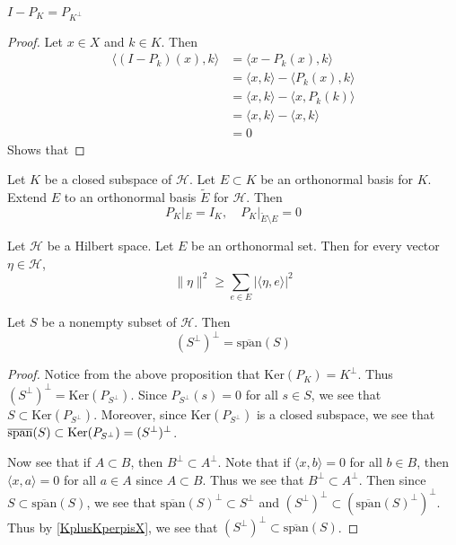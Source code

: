 
\begin{proposition}
  $I-P_K = P_{K^\perp}$
\end{proposition}
\begin{proof}
  Let $x \in X$ and $k \in K$. Then
  \begin{align*}
    \langle (I - P_k)(x), k \rangle &= \langle  x - P_k(x) , k \rangle \\
    &= \langle  x , k \rangle - \langle P_k(x) ,  k \rangle  \\
    &= \langle x , k \rangle  - \langle x , P_k(k) \rangle \\
    &= \langle x , k \rangle  - \langle  x , k \rangle  \\
    &= 0
  \end{align*}
  Shows that
\end{proof}

\begin{proposition}
  Let $K$ be a closed subspace of $\mathcal{H}$. Let $E \subset K$ be
  an orthonormal basis
  for $K$. Extend $E$ to an orthonormal basis $\tilde{E}$ for
  $\mathcal{H}$. Then \[
    P_K|_E = I_K, \quad P_K|_{\tilde{E} \setminus E} = 0
  \]
\end{proposition}

\begin{remark}
  Let $\mathcal{H}$ be a Hilbert space. Let $E$ be an orthonormal set. Then for
  every vector $\eta \in \mathcal{H}$, \[
    \|\eta\|^2 \ge \sum_{e \in E} |\langle \eta ,  e \rangle |^2
  \]
\end{remark}

\begin{lemma}
  Let $S$ be a nonempty subset of $\mathcal{H}$. Then \[
    (S^\perp)^\perp  = \overline{\textrm{span}}(S)
  \]
\end{lemma}
\begin{proof}
  \label{PerpPerpisSpan}
  Notice from the above proposition that $\textrm{Ker}(P_K) =
  K^\perp$. Thus $(S^\perp)^\perp = \textrm{Ker}(P_{S^\perp})$. Since
  $P_{S^\perp}(s) = 0$ for all $s \in S$, we see that $S \subset
  \textrm{Ker}(P_{S^\perp})$. Moreover, since
  $\textrm{Ker}(P_{S^\perp})$ is a closed subspace, we see that
  $\overline{ \textrm{\textrm{span}}}(S) \subset
  \textrm{Ker}(P_{S^\perp}) = ( S^\perp)^\perp$.

  Now see that if $A \subset B$, then $B^\perp \subset A^\perp$. Note
  that if $\langle  x , b \rangle  = 0$ for all $b \in B$, then
  $\langle  x , a \rangle =0$ for all $a \in A$ since $A \subset B$.
  Thus we see that $B^\perp \subset A^\perp$. Then since $S \subset
  \overline{\textrm{span}}(S)$, we see that
  $\overline{\textrm{span}}(S)^\perp \subset S^\perp$ and
  $(S^\perp)^\perp \subset
  (\overline{\textrm{span}}(S)^\perp)^\perp$. Thus by
  \autoref{KplusKperpisX}, we see that $(S^\perp)^\perp \subset
  \overline{\textrm{span}}(S)$.
\end{proof}

